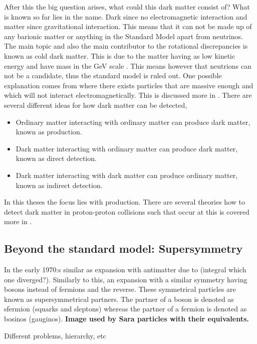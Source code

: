 After this the big question arises, what could this dark matter consist of? What is known so far lies in the name. Dark since no electromagnetic interaction and matter since gravitational interaction. This means that it can not be made up of any barionic matter or anything in the Standard Model apart from neutrinos. The main topic and also the main contributor to the rotational discrepancies is known as cold dark matter. This is due to the matter having as low kinetic energy and have mass in the GeV scale \citep{Goodman:2010,CERN-PH-EP-2012-210,Jungman:1996}. This means however that neutrions can not be a candidate, thus the standard model is ruled out. One possible explanation comes from \abbrSUSY where there exists particles that are massive enough and which will not interact electromagnetically. This is discussed more in .
There are several different ideas for how dark matter can be detected, \citep{Jungman:1996}
\begin{itemize}
\item Ordinary matter interacting with ordinary matter can produce dark matter, known as production.
\item Dark matter interacting with ordinary matter can produce dark matter, known as direct detection.
\item Dark matter interacting with dark matter can produce ordinary matter, known as indirect detection.
\end{itemize} 
In this theses the focus lies with production. There are several theories how to detect dark matter in proton-proton collisions such that occur at \abbrCERN this is covered more in . 

\subsection{Beyond the standard model: Supersymmetry}\label{sec:tb:subsec:bSM}
In the early 1970:s similar as \abbrQED expansion with antimatter due to (integral which one diverged?). Similarly to this, an expansion with a similar symmetry having bosons instead of fermions and the reverse. These symmetrical particles are known as supersymmetrical partners. The \abbrSUSY partner of a boson is denoted as sfermion (squarks and sleptons) whereas the \abbrSUSY partner of a fermion is denoted as bosinos (gauginos).  \textbf{Image used by Sara particles with their equivalents.}

Different problems, hierarchy, etc

